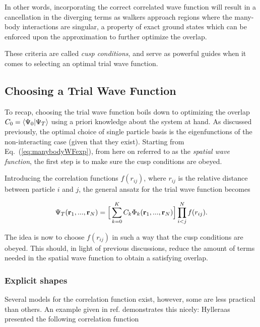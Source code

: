 In other words, incorporating the correct correlated wave function will result in a cancellation in the diverging terms as walkers approach regions where the many-body interactions are singular, a property of exact ground states which can be enforced upon the approximation to further optimize the overlap. 

These criteria are called \textit{cusp conditions}, and serve as powerful guides when it comes to selecting an optimal trial wave function. 


\subsection{Choosing a Trial Wave Function}
\label{sec:ChoiceTrialWF}

To recap, choosing the trial wave function boils down to optimizing the overlap $C_0 = \left\langle \Psi_0 | \Psi_T\right\rangle$ using a priori knowledge about the system at hand. As discussed previously, the optimal choice of single particle basis is the eigenfunctions of the non-interacting case (given that they exist). Starting from Eq.~(\ref{eq:manybodyWFexp}), from here on referred to as the \textit{spatial wave function}, the first step is to make sure the cusp conditions are obeyed.

Introducing the correlation functions $f(r_{ij})$, where $r_{ij}$ is the relative distance between particle $i$ and $j$, the general ansatz for the trial wave function becomes

\begin{equation}
\label{eq:firstAnzatsTWF}
 \Psi_T(\mathbf{r}_1, ..., \mathbf{r}_N) = \Big[\sum_{k=0}^K C_k\Phi_k(\mathbf{r}_1, ..., \mathbf{r}_N)\Big]\prod_{i<j}^Nf(r_{ij}).
\end{equation}

The idea is now to choose $f(r_{ij})$ in such a way that the cusp conditions are obeyed. This should, in light of previous discussions, reduce the amount of terms needed in the spatial wave function to obtain a satisfying overlap.

\subsubsection{Explicit shapes}

Several models for the correlation function exist, however, some are less practical than others. An example given in ref. \cite{abInitioMC} demonstrates this nicely: Hylleraas presented the following correlation function 

